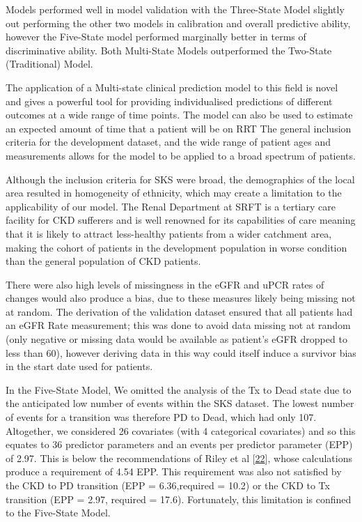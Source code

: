 \documentclass[12pt,PhD,twoside,openright]{muthesis}
\begin{document}
Models performed well in model validation with the Three-State Model slightly out performing the other two models in calibration and overall predictive ability, however the Five-State model performed marginally better in terms of discriminative ability. Both Multi-State Models outperformed the Two-State (Traditional) Model.

The application of a Multi-state clinical prediction model to this field is novel and gives a powerful tool for providing individualised predictions of different outcomes at a wide range of time points. The model can also be used to estimate an expected amount of time that a patient will be on RRT The general inclusion criteria for the development dataset, and the wide range of patient ages and measurements allows for the model to be applied to a broad spectrum of patients.

Although the inclusion criteria for SKS were broad, the demographics of the local area resulted in homogeneity of ethnicity, which may create a limitation to the applicability of our model. The Renal Department at SRFT is a tertiary care facility for CKD sufferers and is well renowned for its capabilities of care meaning that it is likely to attract less-healthy patients from a wider catchment area, making the cohort of patients in the development population in worse condition than the general population of CKD patients.

There were also high levels of missingness in the eGFR and uPCR rates of changes would also produce a bias, due to these measures likely being missing not at random. The derivation of the validation dataset ensured that all patients had an eGFR Rate measurement; this was done to avoid data missing not at random (only negative or missing data would be available as patient's eGFR dropped to less than 60), however deriving data in this way could itself induce a survivor bias in the start date used for patients.

In the Five-State Model, We omitted the analysis of the Tx to Dead state due to the anticipated low number of events within the SKS dataset. The lowest number of events for a transition was therefore PD to Dead, which had only 107. Altogether, we considered 26 covariates (with 4 categorical covariates) and so this equates to 36 predictor parameters and an events per predictor parameter (EPP) of 2.97. This is below the recommendations of Riley et al {[}\protect\hyperlink{ref-riley_minimum_2019}{22}{]}, whose calculations produce a requirement of 4.54 EPP. This requirement was also not satisfied by the CKD to PD transition (EPP = 6.36,required = 10.2) or the CKD to Tx transition (EPP = 2.97, required = 17.6). Fortunately, this limitation is confined to the Five-State Model.
\end{document}
